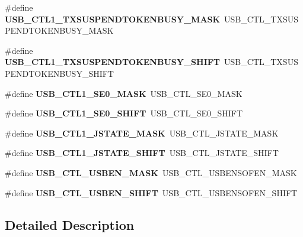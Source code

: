 \begin{DoxyCompactItemize}
\#define {\bfseries U\+S\+B\+\_\+\+C\+T\+L1\+\_\+\+T\+X\+S\+U\+S\+P\+E\+N\+D\+T\+O\+K\+E\+N\+B\+U\+S\+Y\+\_\+\+M\+A\+SK}~U\+S\+B\+\_\+\+C\+T\+L\+\_\+\+T\+X\+S\+U\+S\+P\+E\+N\+D\+T\+O\+K\+E\+N\+B\+U\+S\+Y\+\_\+\+M\+A\+SK
\item 
\mbox{\label{group___s_d_k___compatibility___symbols_gaa77f263346ec4a23fcf7c88df6ca2749}} 
\#define {\bfseries U\+S\+B\+\_\+\+C\+T\+L1\+\_\+\+T\+X\+S\+U\+S\+P\+E\+N\+D\+T\+O\+K\+E\+N\+B\+U\+S\+Y\+\_\+\+S\+H\+I\+FT}~U\+S\+B\+\_\+\+C\+T\+L\+\_\+\+T\+X\+S\+U\+S\+P\+E\+N\+D\+T\+O\+K\+E\+N\+B\+U\+S\+Y\+\_\+\+S\+H\+I\+FT
\item 
\mbox{\label{group___s_d_k___compatibility___symbols_gaad282ef913d748707f00a6fb2339b575}} 
\#define {\bfseries U\+S\+B\+\_\+\+C\+T\+L1\+\_\+\+S\+E0\+\_\+\+M\+A\+SK}~U\+S\+B\+\_\+\+C\+T\+L\+\_\+\+S\+E0\+\_\+\+M\+A\+SK
\item 
\mbox{\label{group___s_d_k___compatibility___symbols_gaea631f6ebe1e2cf8e74cf56692fede47}} 
\#define {\bfseries U\+S\+B\+\_\+\+C\+T\+L1\+\_\+\+S\+E0\+\_\+\+S\+H\+I\+FT}~U\+S\+B\+\_\+\+C\+T\+L\+\_\+\+S\+E0\+\_\+\+S\+H\+I\+FT
\item 
\mbox{\label{group___s_d_k___compatibility___symbols_gaa28fd055a0155fbb6ff8424d304b181a}} 
\#define {\bfseries U\+S\+B\+\_\+\+C\+T\+L1\+\_\+\+J\+S\+T\+A\+T\+E\+\_\+\+M\+A\+SK}~U\+S\+B\+\_\+\+C\+T\+L\+\_\+\+J\+S\+T\+A\+T\+E\+\_\+\+M\+A\+SK
\item 
\mbox{\label{group___s_d_k___compatibility___symbols_ga03d104eabb9c6d3314e58a85d5d059d8}} 
\#define {\bfseries U\+S\+B\+\_\+\+C\+T\+L1\+\_\+\+J\+S\+T\+A\+T\+E\+\_\+\+S\+H\+I\+FT}~U\+S\+B\+\_\+\+C\+T\+L\+\_\+\+J\+S\+T\+A\+T\+E\+\_\+\+S\+H\+I\+FT
\item 
\mbox{\label{group___s_d_k___compatibility___symbols_gab1cecb2aa8cf4018bea184ca2773edeb}} 
\#define {\bfseries U\+S\+B\+\_\+\+C\+T\+L\+\_\+\+U\+S\+B\+E\+N\+\_\+\+M\+A\+SK}~U\+S\+B\+\_\+\+C\+T\+L\+\_\+\+U\+S\+B\+E\+N\+S\+O\+F\+E\+N\+\_\+\+M\+A\+SK
\item 
\mbox{\label{group___s_d_k___compatibility___symbols_ga68b1a8941f1cc06c673d7e93b5b836df}} 
\#define {\bfseries U\+S\+B\+\_\+\+C\+T\+L\+\_\+\+U\+S\+B\+E\+N\+\_\+\+S\+H\+I\+FT}~U\+S\+B\+\_\+\+C\+T\+L\+\_\+\+U\+S\+B\+E\+N\+S\+O\+F\+E\+N\+\_\+\+S\+H\+I\+FT
\end{DoxyCompactItemize}


\subsection{Detailed Description}

